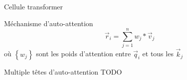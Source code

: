 \begin{frame}{Cellule transformer}
\end{frame}

\begin{frame}{Méchanisme d'auto-attention}
    \[\vec{r}_i=\sum_{j=1}^{n} w_j*\vec{v}_j\]
    où $\left \{w_j\right \}$ sont les poids d'attention entre $\vec{q}_i$ et tous les $\vec{k}_j$
\end{frame}

\begin{frame}{Multiple têtes d'auto-attention}
    \alert{TODO}
\end{frame}
